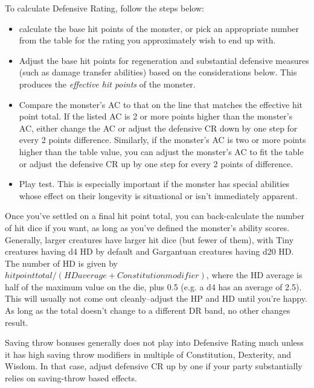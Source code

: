 To calculate Defensive Rating, follow the steps below:
\begin{itemize}
	\item calculate the base hit points of the monster, or pick an appropriate number from the  table for the rating you approximately wish to end up with.
	\item Adjust the base hit points for regeneration and substantial defensive measures (such as damage transfer abilities) based on the considerations below. This produces the \textit{effective hit points} of the monster. 
	\item Compare the monster's AC to that on the line that matches the effective hit point total. If the listed AC is 2 or more points higher than the monster's AC, either change the AC or adjust the defensive CR down by one step for every 2 points difference. Similarly, if the monster's AC is two or more points higher than the table value, you can adjust the monster's AC to fit the table or adjust the defensive CR up by one step for every 2 points of difference.
	\item Play test. This is especially important if the monster has special abilities whose effect on their longevity is situational or isn't immediately apparent.
\end{itemize}

Once you've settled on a final hit point total, you can back-calculate the number of hit dice if you want, as long as you've defined the monster's ability scores. Generally, larger creatures have larger hit dice (but fewer of them), with Tiny creatures having d4 HD by default and Gargantuan creatures having d20 HD. The number of HD is given by $hit point total/(HD average + Constitution modifier)$, where the HD average is half of the maximum value on the die, plus 0.5 (e.g. a d4 has an average of 2.5). This will usually not come out cleanly--adjust the HP and HD until you're happy. As long as the total doesn't change to a different DR band, no other changes result.

Saving throw bonuses generally does not play into Defensive Rating much unless it has high saving throw modifiers in multiple of Constitution, Dexterity, and Wisdom. In that case, adjust defensive CR up by one if your party substantially relies on saving-throw based effects.

